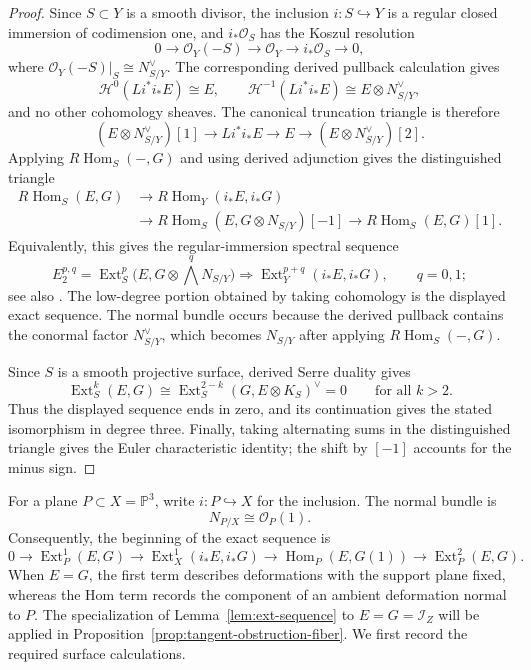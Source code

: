 \documentclass[12pt]{amsart}
\numberwithin{equation}{section}
\newcommand{\PP}{\mathbb{P}}
\newcommand{\OO}{\mathcal{O}}
\newcommand{\I}{\mathcal{I}}
\newcommand{\Ext}{\operatorname{Ext}}
\newcommand{\Hom}{\operatorname{Hom}}
\newcommand{\dual}{\vee}
\theoremstyle{plain}
\theoremstyle{definition}
\theoremstyle{remark}
\begin{document}
\begin{proof}
Since $S\subset Y$ is a smooth divisor, the inclusion $i\colon S\hookrightarrow Y$ is a regular closed immersion of codimension one, and $i_*\OO_S$ has the Koszul resolution
\[
0\longrightarrow \OO_Y(-S)\longrightarrow \OO_Y
\longrightarrow i_*\OO_S\longrightarrow 0,
\]
where $\OO_Y(-S)|_S\cong N_{S/Y}^{\dual}$.
The corresponding derived pullback calculation gives
\[
\mathcal H^0(Li^*i_*E)\cong E,
\qquad
\mathcal H^{-1}(Li^*i_*E)\cong E\otimes N_{S/Y}^{\dual},
\]
and no other cohomology sheaves.
The canonical truncation triangle is therefore
\[
(E\otimes N_{S/Y}^{\dual})[1]
\longrightarrow Li^*i_*E
\longrightarrow E
\longrightarrow (E\otimes N_{S/Y}^{\dual})[2].
\]
Applying $R\!\Hom_S(-,G)$ and using derived adjunction gives the distinguished triangle
\begin{align*}
R\!\Hom_S(E,G)
&\longrightarrow R\!\Hom_Y(i_*E,i_*G) \\
&\longrightarrow R\!\Hom_S(E,G\otimes N_{S/Y})[-1]
\longrightarrow R\!\Hom_S(E,G)[1].
\end{align*}
Equivalently, this gives the regular-immersion spectral sequence
\[
E_2^{p,q}=\Ext^p_S\bigl(E,G\otimes \textstyle\bigwedge^q N_{S/Y}\bigr)
\Longrightarrow \Ext^{p+q}_Y(i_*E,i_*G),
\qquad q=0,1;
\]
see also \cite[p.~1055]{GSlinear}.
The low-degree portion obtained by taking cohomology is the displayed exact sequence.
The normal bundle occurs because the derived pullback contains the conormal factor $N_{S/Y}^{\dual}$, which becomes $N_{S/Y}$ after applying $R\!\Hom_S(-,G)$.

Since $S$ is a smooth projective surface, derived Serre duality gives
\[
\Ext^k_S(E,G)
\cong \Ext^{2-k}_S(G,E\otimes K_S)^{\dual}=0
\qquad\text{for all }k>2.
\]
Thus the displayed sequence ends in zero, and its continuation gives the stated isomorphism in degree three.
Finally, taking alternating sums in the distinguished triangle gives the Euler characteristic identity; the shift by $[-1]$ accounts for the minus sign.
\end{proof}

For a plane $P\subset X=\PP^3$, write $i\colon P\hookrightarrow X$ for the inclusion.
The normal bundle is
\[
N_{P/X}\cong \OO_P(1).
\]
Consequently, the beginning of the exact sequence is
\[
0\longrightarrow \Ext^1_P(E,G)
\longrightarrow \Ext^1_X(i_*E,i_*G)
\longrightarrow \Hom_P(E,G(1))
\longrightarrow \Ext^2_P(E,G).
\]
When $E=G$, the first term describes deformations with the support plane fixed, whereas the Hom term records the component of an ambient deformation normal to $P$.
The specialization of Lemma~\ref{lem:ext-sequence} to $E=G=\I_Z$ will be applied in Proposition~\ref{prop:tangent-obstruction-fiber}.
We first record the required surface calculations.
\end{document}

